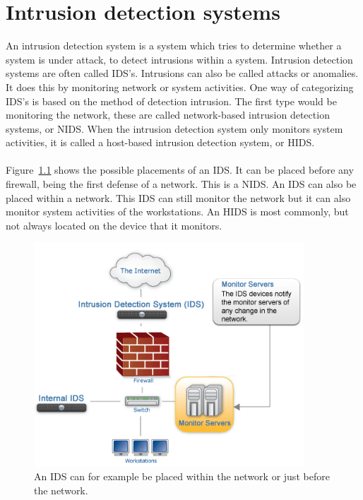 

\chapter{Intrusion detection systems} %
\label{ids}
An intrusion detection system is a system which tries to determine whether a system is under attack, to detect intrusions within a system.  Intrusion detection systems are often called IDS's. Intrusions can also be called attacks or anomalies. It does this by monitoring network or system activities. One way of categorizing IDS's is based on the method of detection intrusion. The first type would be monitoring the network, these are called network-based intrusion detection systems, or NIDS. When the intrusion detection system only monitors system activities, it is called a host-based intrusion detection system, or HIDS. \cite{sans} \\
\\
Figure~\ref{fig:IDS} shows the possible placements of an IDS. It can be placed before any firewall, being the first defense of a network. This is a NIDS. An IDS can also be placed within a network. This IDS can still monitor the network but it can also monitor system activities of the workstations. An HIDS is most commonly, but not always located on the device that it monitors.
\begin{figure}[H]
\centering
\includegraphics[width=0.9\textwidth]{Figures/idsdiagram}
\decoRule
\caption[Possible placement of IDS]{An IDS can for example be placed within the network or just before the network. \cite{ids1}}
\label{fig:IDS}
\end{figure}
